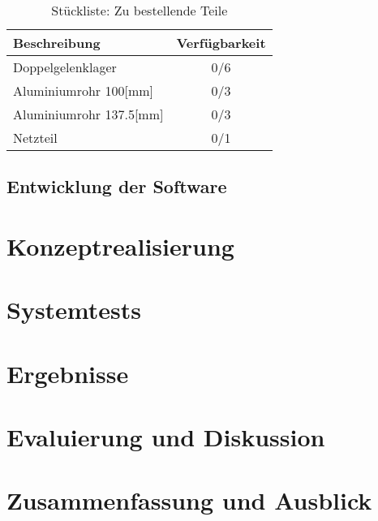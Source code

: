 \documentclass[Bachelor, BMR, ngerman]{twbook}
\begin{document}
    \begin{table}[!htbp]
        \centering
        \caption{Stückliste: Zu bestellende Teile}\label{tab4}
            \begin{tabular}{| l | c |}\hline\rowcolor[gray]{0.8}
                Beschreibung & Verfügbarkeit\\\hline
                
                Doppelgelenklager & 0/6\\\hline
                Aluminiumrohr 100[mm] & 0/3\\\hline
                Aluminiumrohr 137.5[mm] & 0/3\\\hline
                Netzteil & 0/1\\\hline
            \end{tabular}
    \end{table}

\section{Entwicklung der Software}
\chapter{Konzeptrealisierung}
    

\chapter{Systemtests}
\chapter{Ergebnisse}
\chapter{Evaluierung und Diskussion}
\chapter{Zusammenfassung und Ausblick}
\end{document}
